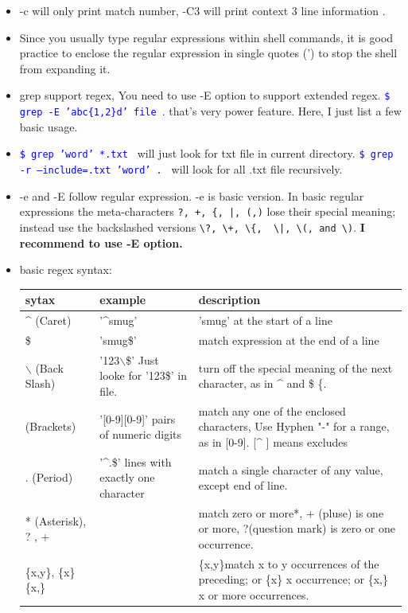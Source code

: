 \documentclass[a4paper,12pt,twoside]{book}
\newcommand{\linuxcommand}[1]{\texttt{\textcolor{blue}{\$ #1 \Pisymbol{psy}{191}}}}
\begin{document}
\begin{itemize}
\item -c will only print  match number, -C3 will print context 3 line information .  

\item Since you usually type regular expressions within shell commands, it is good practice to enclose the regular expression in single quotes (') to stop the shell from expanding it. 

\item grep support regex, You need to use -E option to support extended regex. \linuxcommand{grep -E 'abc\{1,2\}d' file}.  that's very power feature. Here, I just list a few basic usage. 

\item \linuxcommand{grep 'word' *.txt} will just look for txt file in current directory. \linuxcommand{grep -r --include=\*.txt 'word' .} will look for all .txt file recursively. 

\item -e and -E follow regular expression. -e is basic version. In basic regular expressions the meta-characters \verb=?, +, {, |, (,)= lose their special meaning; instead use the backslashed versions \verb=\?, \+, \{,  \|, \(, and \)=. \textbf{I recommend to use -E option.}

\item basic regex syntax:

 \begin{tabular}{p{}|p{}|p{}}
\hline 
sytax 	& example & 	description \\

\hline 
\^{} (Caret)	& '\^{}smug'  & 	'smug' at the start of a line \\
\hline 
\$ &  'smug\$' & 	match expression at the end of a line\\
\hline 
$\backslash$ (Back Slash)&   '123$\backslash$\$'  Just looke for '123\$' in file. &	turn off the special meaning of the next character, as in \^{} and \$ \{.   \\
\hline 
[ ] (Brackets)	&'[0-9][0-9]' pairs of numeric digits &	match any one of the enclosed characters,  Use Hyphen "-" for a range, as in [0-9].  [\^{} ] means excludes\\
\hline 
. (Period) & '\^{}.\$' lines with exactly one character  &	match a single character of any value, except end of line. \\
\hline 
* (Asterisk), ? , + &  &	match zero or more*,  + (pluse) is one or more,   ?(question mark) is zero or one occurrence.   \\
\hline 
\{x,y\}, 	\{x\}	\{x,\} & &	\{x,y\}match x to y occurrences of the preceding;  or \{x\} x occurrence; or  \{x,\} x or more occurrences. \\
\hline 


\end{tabular}
\end{itemize}
\end{document}
